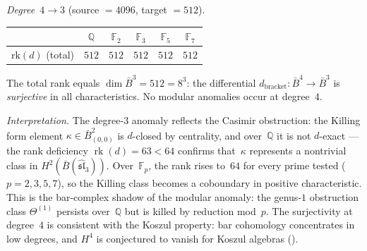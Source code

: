\begin{computation}
\emph{Degree~$4 \to 3$} (source $= 4096$, target $= 512$).
\begin{center}
\renewcommand{\arraystretch}{1.2}
\begin{tabular}{c|ccccc}
& $\mathbb{Q}$ & $\mathbb{F}_2$ & $\mathbb{F}_3$ &
$\mathbb{F}_5$ & $\mathbb{F}_7$ \\
\hline
$\mathrm{rk}(d)$ (total) & $512$ & $512$ & $512$ & $512$ & $512$
\end{tabular}
\end{center}
The total rank equals $\dim \bar{B}^3 = 512 = 8^3$: the differential
$d_{\mathrm{bracket}}\colon \bar{B}^4 \to \bar{B}^3$ is
\emph{surjective} in all characteristics.  No modular anomalies
occur at degree~$4$.

\emph{Interpretation.}  The degree-$3$ anomaly reflects the
Casimir obstruction: the Killing form element
$\kappa \in \bar{B}^2_{(0,0)}$ is $d$-closed by centrality,
and over~$\mathbb{Q}$ it is not $d$-exact --- the rank deficiency
$\operatorname{rk}(d) = 63 < 64$ confirms that~$\kappa$
represents a nontrivial class in
$H^2(\bar{B}(\widehat{\mathfrak{sl}}_3))$.
Over~$\mathbb{F}_p$, the rank rises to~$64$ for every prime
tested ($p = 2, 3, 5, 7$), so the Killing class becomes a
coboundary in positive characteristic.  This is the bar-complex
shadow of the modular anomaly: the genus-$1$ obstruction class
$\Theta^{(1)}$ persists over~$\mathbb{Q}$ but is killed by
reduction mod~$p$.  The surjectivity at degree~$4$ is consistent
with the Koszul property: bar cohomology concentrates in low
degrees, and $H^4$ is conjectured to vanish for Koszul algebras
(\ClaimStatusConjectured).
\end{computation}


